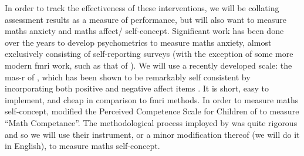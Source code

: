 \documentclass[twoside,12pt,a4paper]{report}
\begin{document}
In order to track the effectiveness of these interventions, we will be collating assessment results as a measure of performance, but will also want to measure maths anxiety and maths affect/ self-concept. Significant work has been done over the years to develop psychometrics to measure maths anxiety, almost exclusively consisting of self-reporting surveys (with the exception of some more modern \gls{fmri} work, such as that of ). We will use a recently developed scale: the \gls{mas-r} of , which has been shown to be remarkably self consistent by incorporating both positive and negative affect items \cite{Bai2011}. It is short, easy to implement, and cheap in comparison to \gls{fmri} methods. In order to measure maths self-concept,  modified the Perceived Competence Scale for Children of  to measure ``Math Competance''. The methodological process imployed by  was quite rigorous and so we will use their instrument, or a minor modification thereof (we will do it in English), to measure maths self-concept.









%



\pagebreak
\printglossaries

\glsresetall

 
\end{document}
